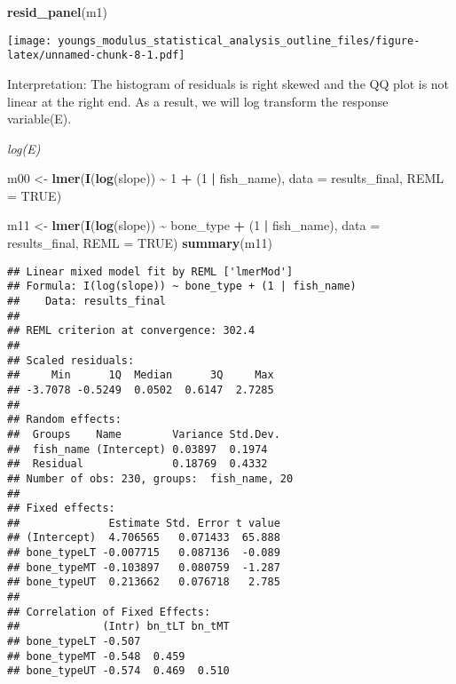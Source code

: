 \documentclass[
]{article}
\newenvironment{Shaded}{\begin{snugshade}}{\end{snugshade}}
\newcommand{\AttributeTok}[1]{\textcolor[rgb]{0.13,0.29,0.53}{#1}}
\newcommand{\ConstantTok}[1]{\textcolor[rgb]{0.56,0.35,0.01}{#1}}
\newcommand{\DecValTok}[1]{\textcolor[rgb]{0.00,0.00,0.81}{#1}}
\newcommand{\FunctionTok}[1]{\textcolor[rgb]{0.13,0.29,0.53}{\textbf{#1}}}
\newcommand{\NormalTok}[1]{#1}
\newcommand{\OtherTok}[1]{\textcolor[rgb]{0.56,0.35,0.01}{#1}}
\newcommand{\SpecialCharTok}[1]{\textcolor[rgb]{0.81,0.36,0.00}{\textbf{#1}}}
\begin{document}
\begin{Shaded}
\begin{Highlighting}[]
\FunctionTok{resid\_panel}\NormalTok{(m1)}
\end{Highlighting}
\end{Shaded}

\texttt{[image: youngs\_modulus\_statistical\_analysis\_outline\_files/figure-latex/unnamed-chunk-8-1.pdf]}

Interpretation: The histogram of residuals is right skewed and the QQ
plot is not linear at the right end. As a result, we will log transform
the response variable(E).

\emph{log(E)}

\begin{Shaded}
\begin{Highlighting}[]
\NormalTok{m00 }\OtherTok{\textless{}{-}} \FunctionTok{lmer}\NormalTok{(}\FunctionTok{I}\NormalTok{(}\FunctionTok{log}\NormalTok{(slope)) }\SpecialCharTok{\textasciitilde{}}  \DecValTok{1} \SpecialCharTok{+}\NormalTok{ (}\DecValTok{1} \SpecialCharTok{|}\NormalTok{ fish\_name), }\AttributeTok{data =}\NormalTok{ results\_final, }\AttributeTok{REML =} \ConstantTok{TRUE}\NormalTok{)}

\NormalTok{m11 }\OtherTok{\textless{}{-}} \FunctionTok{lmer}\NormalTok{(}\FunctionTok{I}\NormalTok{(}\FunctionTok{log}\NormalTok{(slope)) }\SpecialCharTok{\textasciitilde{}}\NormalTok{  bone\_type }\SpecialCharTok{+}\NormalTok{ (}\DecValTok{1} \SpecialCharTok{|}\NormalTok{ fish\_name), }\AttributeTok{data =}\NormalTok{ results\_final, }\AttributeTok{REML =} \ConstantTok{TRUE}\NormalTok{)}
\FunctionTok{summary}\NormalTok{(m11)}
\end{Highlighting}
\end{Shaded}

\begin{verbatim}
## Linear mixed model fit by REML ['lmerMod']
## Formula: I(log(slope)) ~ bone_type + (1 | fish_name)
##    Data: results_final
## 
## REML criterion at convergence: 302.4
## 
## Scaled residuals: 
##     Min      1Q  Median      3Q     Max 
## -3.7078 -0.5249  0.0502  0.6147  2.7285 
## 
## Random effects:
##  Groups    Name        Variance Std.Dev.
##  fish_name (Intercept) 0.03897  0.1974  
##  Residual              0.18769  0.4332  
## Number of obs: 230, groups:  fish_name, 20
## 
## Fixed effects:
##              Estimate Std. Error t value
## (Intercept)  4.706565   0.071433  65.888
## bone_typeLT -0.007715   0.087136  -0.089
## bone_typeMT -0.103897   0.080759  -1.287
## bone_typeUT  0.213662   0.076718   2.785
## 
## Correlation of Fixed Effects:
##             (Intr) bn_tLT bn_tMT
## bone_typeLT -0.507              
## bone_typeMT -0.548  0.459       
## bone_typeUT -0.574  0.469  0.510
\end{verbatim}
\end{document}
